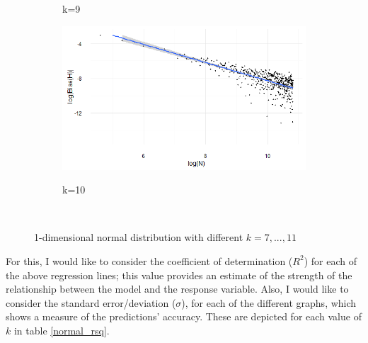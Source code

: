 \documentclass[12pt]{report}
\begin{document}
\begin{figure}
{\begin{subfigure}[b]{.6\textwidth}
\caption{k=9}
\end{subfigure}%
\begin{subfigure}[b]{.6\textwidth}
\centering
\includegraphics[width=\textwidth]{./Graphs/Best/Normal_k=10.png}\label{normal_k=10}
\caption{k=10}
\end{subfigure}%
}\    
\caption{1-dimensional normal distribution with different $k = 7, ...,11$} \label{normal_graphs711}
\end{figure}

For this, I would like to consider the coefficient of determination ($R^2$) for each of the above regression lines; this value provides an estimate of the strength of the relationship between the model and the response variable. Also, I would like to consider the standard error/deviation ($\sigma$), for each of the different graphs, which shows a measure of the predictions' accuracy. These are depicted for each value of $k$ in table \ref{normal_rsq}.
\end{document}
